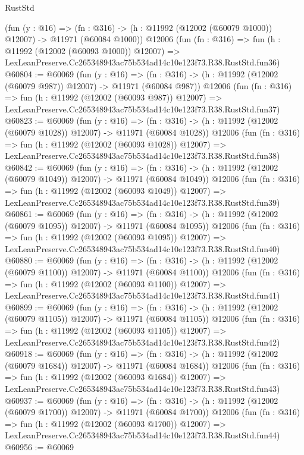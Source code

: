 \begin{lexlean}{RustStd}
\begin{coremodule}
    (fun (y : @16) =>
    (fn : @316) -> (h : @11992 (@12002 (@60079 @1000)) @12007) -> @11971 (@60084 @1000))
    @12006
    (fun (fn : @316) =>
    fun (h : @11992 (@12002 (@60093 @1000)) @12007) =>
    LexLeanPreserve.Cc265348943ac75b534ad14c10e123f73.R38.RustStd.fun36)
@60804 := @60069
    (fun (y : @16) =>
    (fn : @316) -> (h : @11992 (@12002 (@60079 @987)) @12007) -> @11971 (@60084 @987))
    @12006
    (fun (fn : @316) =>
    fun (h : @11992 (@12002 (@60093 @987)) @12007) =>
    LexLeanPreserve.Cc265348943ac75b534ad14c10e123f73.R38.RustStd.fun37)
@60823 := @60069
    (fun (y : @16) =>
    (fn : @316) -> (h : @11992 (@12002 (@60079 @1028)) @12007) -> @11971 (@60084 @1028))
    @12006
    (fun (fn : @316) =>
    fun (h : @11992 (@12002 (@60093 @1028)) @12007) =>
    LexLeanPreserve.Cc265348943ac75b534ad14c10e123f73.R38.RustStd.fun38)
@60842 := @60069
    (fun (y : @16) =>
    (fn : @316) -> (h : @11992 (@12002 (@60079 @1049)) @12007) -> @11971 (@60084 @1049))
    @12006
    (fun (fn : @316) =>
    fun (h : @11992 (@12002 (@60093 @1049)) @12007) =>
    LexLeanPreserve.Cc265348943ac75b534ad14c10e123f73.R38.RustStd.fun39)
@60861 := @60069
    (fun (y : @16) =>
    (fn : @316) -> (h : @11992 (@12002 (@60079 @1095)) @12007) -> @11971 (@60084 @1095))
    @12006
    (fun (fn : @316) =>
    fun (h : @11992 (@12002 (@60093 @1095)) @12007) =>
    LexLeanPreserve.Cc265348943ac75b534ad14c10e123f73.R38.RustStd.fun40)
@60880 := @60069
    (fun (y : @16) =>
    (fn : @316) -> (h : @11992 (@12002 (@60079 @1100)) @12007) -> @11971 (@60084 @1100))
    @12006
    (fun (fn : @316) =>
    fun (h : @11992 (@12002 (@60093 @1100)) @12007) =>
    LexLeanPreserve.Cc265348943ac75b534ad14c10e123f73.R38.RustStd.fun41)
@60899 := @60069
    (fun (y : @16) =>
    (fn : @316) -> (h : @11992 (@12002 (@60079 @1105)) @12007) -> @11971 (@60084 @1105))
    @12006
    (fun (fn : @316) =>
    fun (h : @11992 (@12002 (@60093 @1105)) @12007) =>
    LexLeanPreserve.Cc265348943ac75b534ad14c10e123f73.R38.RustStd.fun42)
@60918 := @60069
    (fun (y : @16) =>
    (fn : @316) -> (h : @11992 (@12002 (@60079 @1684)) @12007) -> @11971 (@60084 @1684))
    @12006
    (fun (fn : @316) =>
    fun (h : @11992 (@12002 (@60093 @1684)) @12007) =>
    LexLeanPreserve.Cc265348943ac75b534ad14c10e123f73.R38.RustStd.fun43)
@60937 := @60069
    (fun (y : @16) =>
    (fn : @316) -> (h : @11992 (@12002 (@60079 @1700)) @12007) -> @11971 (@60084 @1700))
    @12006
    (fun (fn : @316) =>
    fun (h : @11992 (@12002 (@60093 @1700)) @12007) =>
    LexLeanPreserve.Cc265348943ac75b534ad14c10e123f73.R38.RustStd.fun44)
@60956 := @60069

\end{coremodule}
\end{lexlean}
